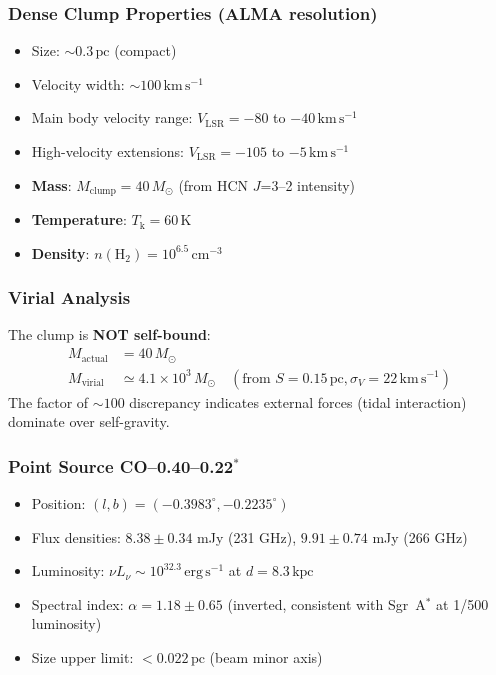 \documentclass[11pt,a4paper]{article}
\newcommand{\Msun}{M_\odot}
\newcommand{\kms}{\,\mathrm{km\,s^{-1}}}
\newcommand{\pc}{\,\mathrm{pc}}
\newcommand{\cmcubed}{\,\mathrm{cm^{-3}}}
\begin{document}
\subsubsection{Dense Clump Properties (ALMA resolution)}
\begin{itemize}
    \item Size: $\sim 0.3\pc$ (compact)
    \item Velocity width: $\sim 100\kms$
    \item Main body velocity range: $V_\mathrm{LSR} = -80$ to $-40\kms$
    \item High-velocity extensions: $V_\mathrm{LSR} = -105$ to $-5\kms$
    \item \textbf{Mass}: $M_\mathrm{clump} = 40\,\Msun$ (from HCN $J$=3--2 intensity)
    \item \textbf{Temperature}: $T_\mathrm{k} = 60\,\mathrm{K}$
    \item \textbf{Density}: $n(\mathrm{H}_2) = 10^{6.5}\cmcubed$
\end{itemize}

\subsubsection{Virial Analysis}
The clump is \textbf{NOT self-bound}:
\begin{align}
    M_\mathrm{actual} &= 40\,\Msun \\
    M_\mathrm{virial} &\simeq 4.1 \times 10^3\,\Msun \quad (\text{from } S = 0.15\pc, \sigma_V = 22\kms)
\end{align}
The factor of $\sim 100$ discrepancy indicates external forces (tidal interaction) dominate over self-gravity.

\subsubsection{Point Source CO--0.40--0.22$^*$}
\begin{itemize}
    \item Position: $(l, b) = (-0.3983^\circ, -0.2235^\circ)$
    \item Flux densities: $8.38 \pm 0.34$ mJy (231 GHz), $9.91 \pm 0.74$ mJy (266 GHz)
    \item Luminosity: $\nu L_\nu \sim 10^{32.3}\,\mathrm{erg\,s^{-1}}$ at $d = 8.3\,\mathrm{kpc}$
    \item Spectral index: $\alpha = 1.18 \pm 0.65$ (inverted, consistent with Sgr~A$^*$ at 1/500 luminosity)
    \item Size upper limit: $< 0.022\pc$ (beam minor axis)
\end{itemize}
\end{document}
